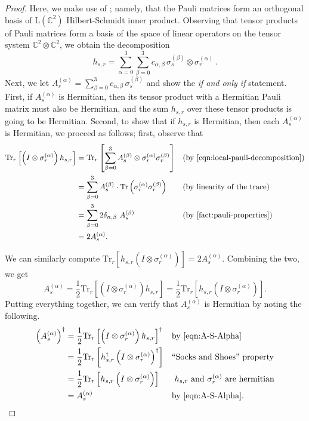 \documentclass[11pt]{article}
\theoremstyle{plain}
\begin{document}
\begin{proof}
Here, we make use of ; namely, that the Pauli matrices form an orthogonal basis of $\mathrm{L}(\mathbb{C}^{2})$ Hilbert-Schmidt inner product. Observing that tensor products of Pauli matrices form a basis 
of the space of linear operators on the tensor system $\mathbb{C}^{2} \otimes \mathbb{C}^{2}$, we obtain the decomposition
    \[ h_{s,r} = \sum_{\alpha=0}^{3} \sum_{\beta=0}^{3} c_{\alpha, \beta} \, \sigma_s^{(\beta)} \otimes \sigma_r^{(\alpha)} \, .\]
Next, we let $A^{(\alpha)}_s = \sum_{\beta=0}^{3} c_{\alpha, \beta} \, \sigma_s^{(\beta)}$ and show the \emph{if and only if} statement. First, if $A^{(\alpha)}_s$ is Hermitian, then its tensor product with a Hermitian Pauli matrix must also be Hermitian, and the sum $h_{s,r}$ over these tensor products is going to be Hermitian. Second, to show that if $h_{s,r}$ is Hermitian, then each $A^{(\alpha)}_s$ is Hermitian, we proceed as follows; first, observe that
\begin{align}
\mathrm{Tr}_{r}\left[\left(I \otimes \sigma_r^{(\alpha)} \right) h_{s,r} \right] &= \mathrm{Tr}_{r} \left[\sum\limits_{\beta = 0}^{3} A_s^{(\beta)} \otimes \sigma_r^{(\alpha)} \sigma_r^{(\beta)}\right] && \text{(by \Cref{eqn:local-pauli-decomposition})}\\
    &= \sum\limits_{\beta = 0}^{3} A_s^{(\beta)} \cdot \mathrm{Tr}\left(\sigma_r^{(\alpha)} \sigma_r^{(\beta)}\right) && \text{(by linearity of the trace)}\\
    &= \sum\limits_{\beta = 0}^{3} 2\delta_{\alpha, \beta}\ A_s^{(\beta)}&& (\text{by \Cref{fact:pauli-properties}})\\
    &= 2 A_s^{(\alpha)}.
\end{align}

\noindent We can similarly compute $\mathrm{Tr}_{r}\left[ h_{s,r} \left(I \otimes \sigma_r^{(\alpha)} \right)\right] = 2 A_s^{(\alpha)}$. Combining the two, we get
\begin{equation}\label{eqn:A-S-Alpha}
    A_s^{(\alpha)} = \frac{1}{2} \mathrm{Tr}_{r}\left[\left(I \otimes \sigma_r^{(\alpha)} \right) h_{s,r} \right] = \frac{1}{2} \mathrm{Tr}_{r}\left[ h_{s,r} \left(I \otimes \sigma_r^{(\alpha)} \right)\right].
\end{equation}
Putting everything together, we can verify that $A_s^{(\alpha)}$ is Hermitian by noting the following.
\begin{align}
\left(A_s^{(\alpha)}\right)^\dagger &= \frac{1}{2} \mathrm{Tr}_{r}\left[\left(I \otimes \sigma_r^{(\alpha)} \right) h_{s,r} \right]^\dagger && \text{by \Cref{eqn:A-S-Alpha}}\\
    &= \frac{1}{2} \mathrm{Tr}_{r}\left[ h_{s,r}^\dagger \left(I \otimes \sigma_r^{(\alpha)} \right)^\dagger \right] && \text{``Socks and Shoes'' property} \\
    &= \frac{1}{2} \mathrm{Tr}_{r}\left[ h_{s,r} \left(I \otimes \sigma_r^{(\alpha)} \right) \right] && \text{ $h_{s,r}$ and $\sigma_r^{(\alpha)}$ are hermitian}\\
    &= A_s^{(\alpha)} && \text{by \Cref{eqn:A-S-Alpha}.}
\end{align}
\end{proof}
\end{document}
